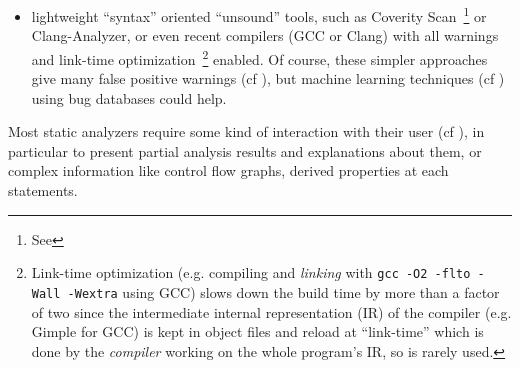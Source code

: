 \begin{itemize}
  \item lightweight ``syntax'' oriented ``unsound'' tools, such as
    Coverity Scan~\footnote{See } or
    Clang-Analyzer, or even recent compilers (GCC or Clang) with all
    warnings and link-time optimization~\footnote{Link-time
      optimization (e.g. compiling and \emph{linking} with \texttt{gcc
        -O2 -flto -Wall -Wextra} using GCC) slows down the build time by more than a
      factor of two since the intermediate internal representation (IR) of the
      compiler (e.g. Gimple for GCC) is kept in object files and
      reload at ``link-time'' which is done by the \emph{compiler}
      working on the whole program's IR, so is rarely used.}  enabled. Of
    course, these simpler approaches give many false positive warnings
    (cf \cite{Nadeem:2012:HFP}), but machine learning techniques (cf
    \cite{Perl:2015:VFP}) using bug databases could help.
    
\end{itemize}
Most static analyzers require some kind of interaction with their user
(cf \cite{Lipford:2014:ICA}), in particular to present partial
analysis results and explanations about them, or complex information
like control flow graphs, derived properties at each statements.

